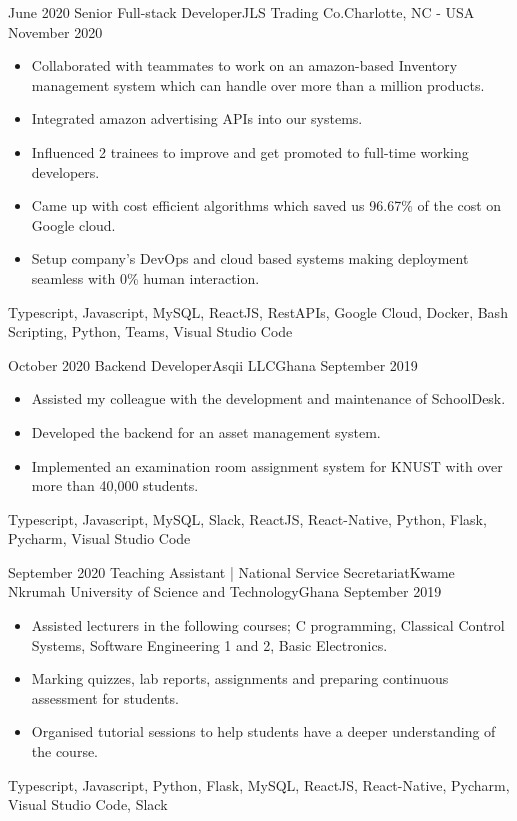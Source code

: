 \begin{experiences}
      \experience
    {June 2020}   {Senior Full-stack Developer}{JLS Trading Co.}{Charlotte, NC - USA}
    {November 2020} {
                      \begin{itemize}
			\item Collaborated with teammates to work on an amazon-based Inventory management system which can handle over more than a million products.
			\item Integrated amazon advertising APIs into our systems.
			\item Influenced 2 trainees to improve and get promoted to full-time working developers.
			\item Came up with cost efficient algorithms which saved us 96.67\% of the cost on Google cloud.
			\item Setup company’s DevOps and cloud based systems making deployment seamless with 0\% human interaction.
		    \end{itemize}
                    }
                    {Typescript, Javascript, MySQL, ReactJS, RestAPIs, Google Cloud, Docker, Bash Scripting, Python, Teams, Visual Studio Code}
  \emptySeparator

  
  \experience
    {October 2020}   {Backend Developer}{Asqii LLC}{Ghana}
    {September 2019} {
                      \begin{itemize}
                        \item Assisted my colleague with the development and maintenance of SchoolDesk.
                        \item Developed the backend for an asset management system.
                        \item Implemented an examination room assignment system for KNUST with over more than 40,000 students.
                      \end{itemize}
                    }
                    {Typescript, Javascript, MySQL, Slack, ReactJS, React-Native, Python, Flask, Pycharm, Visual Studio Code}
  \emptySeparator
  
  
    \experience
    {September 2020}   {Teaching Assistant | National Service Secretariat}{Kwame Nkrumah University of Science and Technology}{Ghana}
    {September 2019} {
                      \begin{itemize}
                        \item Assisted lecturers in the following courses; C programming, Classical Control Systems, Software Engineering 1 and 2, Basic Electronics.
                        \item Marking quizzes, lab reports, assignments and preparing continuous assessment for students.
                        \item Organised tutorial sessions to help students have a deeper understanding of the course.
                      \end{itemize}
                    }
                    {Typescript, Javascript, Python, Flask, MySQL, ReactJS, React-Native, Pycharm, Visual Studio Code, Slack}
  \emptySeparator
  

\end{experiences}

